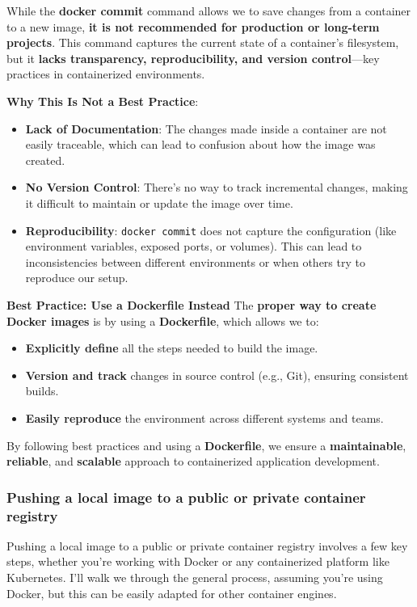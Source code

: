 \documentclass{article}
\newenvironment{blocktemplateIII}[1]{%
    \tcolorbox[beamer,%
    noparskip,breakable,
    ,colframe=Red,%
    colbacklower=LimeGreen!75!LightGreen,%
    title=#1]}%
    {\endtcolorbox}
\begin{document}
\begin{blocktemplateIII}{WARNING}
While the \textbf{docker commit} command allows we to save changes from a container to a new image, \textbf{it is not recommended for production or long-term projects}. This command captures the current state of a container's filesystem, but it \textbf{lacks transparency, reproducibility, and version control}—key practices in containerized environments.

\textbf{Why This Is Not a Best Practice}:
\begin{itemize} 
    \item \textbf{Lack of Documentation}: The changes made inside a container are not easily traceable, which can lead to confusion about how the image was created. 
    \item \textbf{No Version Control}: There's no way to track incremental changes, making it difficult to maintain or update the image over time. 
    \item \textbf{Reproducibility}: \verb|docker commit| does not capture the configuration (like environment variables, exposed ports, or volumes). This can lead to inconsistencies between different environments or when others try to reproduce our setup. 
\end{itemize}

\textbf{Best Practice: Use a Dockerfile Instead}
The \textbf{proper way to create Docker images} is by using a \textbf{Dockerfile}, which allows we to: 
\begin{itemize} 
    \item \textbf{Explicitly define} all the steps needed to build the image. 
    \item \textbf{Version and track} changes in source control (e.g., Git), ensuring consistent builds. 
    \item \textbf{Easily reproduce} the environment across different systems and teams. 
\end{itemize}

By following best practices and using a \textbf{Dockerfile}, we ensure a \textbf{maintainable}, \textbf{reliable}, and \textbf{scalable} approach to containerized application development.
\end{blocktemplateIII}

\subsubsection{Pushing a local image to a public or private container registry}
Pushing a local image to a public or private container registry involves a few key steps, whether you're working with Docker or any containerized platform like Kubernetes. I'll walk we through the general process, assuming you're using Docker, but this can be easily adapted for other container engines.
\end{document}

